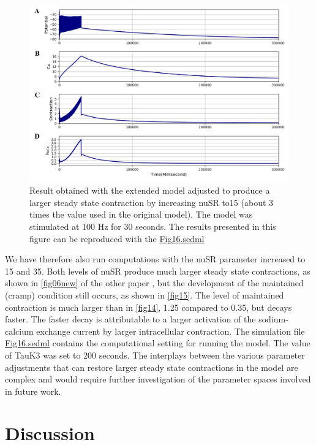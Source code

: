 \documentclass[fleqn,10pt]{physiome}
\begin{document}
\begin{figure}[h!]
\centering
\includegraphics[width=0.9\linewidth]{figure15}
\caption{Result obtained with the extended model adjusted to produce a larger steady state contraction by increasing nuSR to15 (about 3 times the value used in the original model). The model was stimulated at 100 Hz for 30 seconds. The results presented in this figure can be reproduced with the \href{https://models.physiomeproject.org/workspace/5f4/file/26289d9227fbf4f66ca8106d8bf80ff9a51a5ac6/Fig16.sedml}{Fig16.sedml}}
\label{fig15}
\end{figure}


\newpage
We have therefore also run computations with the nuSR parameter increased to 15 and 35. Both levels of nuSR produce much larger steady state contractions, as shown in \autoref{fig06new} of the other paper \citep{Noble2019Incorporation}, but the development of the maintained (cramp) condition still occurs, as shown in \autoref{fig15}. The level of maintained contraction is much larger than in \autoref{fig14}, 1.25 compared to 0.35, but decays faster. The faster decay is attributable to a larger activation of the sodium-calcium exchange current by larger intracellular contraction. The simulation file \href{http://models.cellml.org/workspace/5f4/file/099d70c2ee6ed5dfb1ca33e0ce16db4f0247a4dc/Fig16.sedml}{Fig16.sedml} contains the computational setting for running the model. The value of TauK3 was set to 200 seconds. The interplays between the various parameter adjustments that can restore larger steady state contractions in the model are complex and would require further investigation of the parameter spaces involved in future work.

\section{Discussion}
\end{document}
